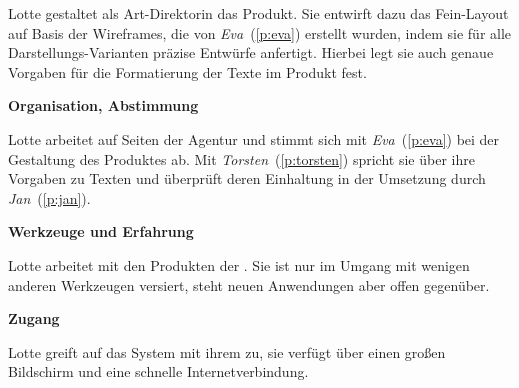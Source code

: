 \begin{multicols}{2}

\begin{center}
\end{center}


Lotte gestaltet als Art-Direktorin das Produkt. Sie entwirft dazu das Fein-Layout auf Basis der Wireframes, die von \emph{Eva}~(\ref{p:eva}) erstellt wurden, indem sie für alle Darstellungs-Varianten präzise Entwürfe anfertigt. Hierbei legt sie auch genaue Vorgaben für die Formatierung der Texte im Produkt fest.

\textbf{Organisation, Abstimmung}

Lotte arbeitet auf Seiten der Agentur und stimmt sich mit \emph{Eva}~(\ref{p:eva}) bei der Gestaltung des Produktes ab. Mit \emph{Torsten}~(\ref{p:torsten}) spricht sie über ihre Vorgaben zu Texten und überprüft deren Einhaltung in der Umsetzung durch \emph{Jan}~(\ref{p:jan}).

\textbf{Werkzeuge und Erfahrung}

Lotte arbeitet mit den Produkten der . Sie ist nur im Umgang mit wenigen anderen Werkzeugen versiert, steht neuen Anwendungen aber offen gegenüber.

\textbf{Zugang}

Lotte greift auf das System mit ihrem  zu, sie verfügt über einen großen Bildschirm und eine schnelle Internetverbindung.

\columnbreak


\end{multicols}

